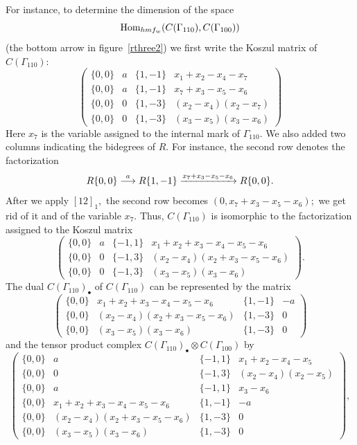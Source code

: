\documentclass[12pt]{article}
\begin{document}
For instance, to determine the dimension of the space 
$$\mathrm{Hom}_{hmf_w}(C(\Gamma_{110}), C(\Gamma_{100}))$$ (the bottom 
arrow in figure~\ref{rthree2}) 
we first write the Koszul matrix of $C(\Gamma_{110}):$
$$ \left( \begin{array}{cccc}
 \{0,0\} & a &  \{1,-1\} & x_1+x_2-x_4-x_7  \\
 \{0,0\} & a &  \{1,-1\} & x_7+x_3-x_5-x_6  \\
 \{0,0\} & 0 &  \{1, -3\} & (x_2-x_4)(x_2-x_7)  \\
 \{0,0\} & 0 &  \{1,-3\} & (x_3-x_5)(x_3-x_6) \end{array} \right) $$ 
Here $x_7$ is the variable assigned to the internal mark of 
$\Gamma_{110}.$  We also added two columns indicating the bidegrees of $R.$ 
For instance, the second row denotes the factorization
$$ R\{0,0\} \stackrel{a}{\longrightarrow} R\{1,-1\} 
  \xrightarrow{x_7+x_3-x_5-x_6} R\{0,0\}.$$
After we apply $[12]_1,$ the second row becomes $(0,x_7+x_3-x_5-x_6);$ 
 we get rid of it and of the variable $x_7.$ Thus, $C(\Gamma_{110})$ 
is isomorphic to the factorization assigned to the Koszul matrix 
$$  \left( \begin{array}{cccc}
 \{0,0\} & a &  \{-1,1\} & x_1+x_2+x_3-x_4-x_5-x_6  \\
 \{0,0\} & 0 &  \{-1, 3\} & (x_2-x_4)(x_2+x_3-x_5-x_6)  \\
 \{0,0\} & 0 &  \{-1,3\} & (x_3-x_5)(x_3-x_6) \end{array} \right). $$ 
The dual $C(\Gamma_{110})_{\bullet}$ of $C(\Gamma_{110})$ can 
be represented by the matrix 
$$  \left( \begin{array}{cccc}
 \{0,0\} & x_1+x_2+x_3-x_4-x_5-x_6 &  \{1,-1\} & -a  \\
 \{0,0\} & (x_2-x_4)(x_2+x_3-x_5-x_6) &  \{1,-3\} & 0  \\
 \{0,0\} &(x_3-x_5)(x_3-x_6) &  \{1,-3\} & 0 \end{array} \right) $$ 
and the tensor product complex $C(\Gamma_{110})_{\bullet}\otimes 
C(\Gamma_{100})$ by 
$$ \left( \begin{array}{cccc}
\{0,0\} & a & \{-1,1\} & x_1+x_2-x_4-x_5  \\
 \{0,0\} & 0 & \{-1,3\} &  (x_2-x_4)(x_2-x_5) \\
  \{0,0\} & a & \{-1,1\} &  x_3-x_6 \\
 \{0,0\} & x_1+x_2+x_3-x_4-x_5-x_6 &  \{1,-1\} & -a  \\
 \{0,0\} & (x_2-x_4)(x_2+x_3-x_5-x_6) &  \{1,-3\} & 0  \\
 \{0,0\} &(x_3-x_5)(x_3-x_6) &  \{1,-3\} & 0 \end{array} \right), $$
\end{document}
